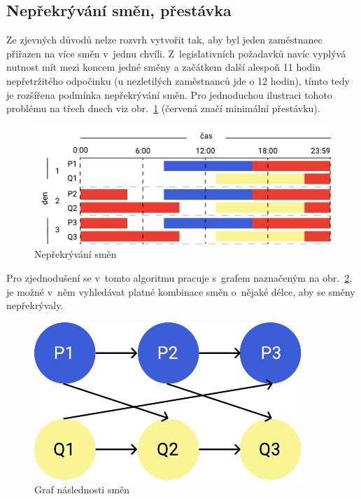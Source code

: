 \documentclass[twoside]{ctuthesis}
\begin{document}
\subsection{Nepřekrývání směn, přestávka}
Ze zjevných důvodů nelze rozvrh vytvořit tak, aby byl jeden zaměstnanec přiřazen na více směn v~jednu chvíli. Z~legislativních požadavků navíc vyplývá nutnost mít mezi koncem jedné směny a začátkem další alespoň 11 hodin nepřetržitého odpočinku (u nezletilých zaměstnanců jde o 12 hodin), tímto tedy je rozšířena podmínka nepřekrývání směn. Pro jednoduchou ilustraci tohoto problému na třech dnech viz obr.~\ref{fig:shiftprecedencefull} (červená značí minimální přestávku).

\begin{figure}[h!]
	\includegraphics[scale=0.7]{img/shift-overlap.pdf}
	\caption{Nepřekrývání směn}
	\label{fig:shiftprecedencefull}
\end{figure}

Pro zjednodušení se v~tomto algoritmu pracuje s~grafem naznačeným na obr.~\ref{fig:shiftprecedence}, je možné v~něm vyhledávat platné kombinace směn o~nějaké délce, aby se směny nepřekrývaly.

\begin{figure}[h!]
	\includegraphics[scale=0.7]{img/shift-overlap-small.pdf}
	\caption{Graf následnosti směn}
	\label{fig:shiftprecedence}
\end{figure}
\end{document}

